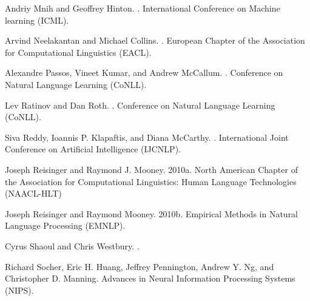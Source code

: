 \documentclass[11pt,a4paper]{article}
\begin{document}
\begin{thebibliography}{}
Andriy Mnih and Geoffrey Hinton.
.
\newblock International Conference on Machine learning (ICML).

Arvind Neelakantan and Michael Collins.
.
\newblock European Chapter of the Association for Computational Linguistics (EACL).

Alexandre Passos, Vineet Kumar, and Andrew McCallum.
.
\newblock Conference on Natural Language Learning (CoNLL).

Lev Ratinov and Dan Roth.
.
\newblock Conference on Natural Language Learning (CoNLL).

Siva Reddy, Ioannis P. Klapaftis, and Diana McCarthy.
.
\newblock International Joint Conference on Artificial Intelligence (IJCNLP).

Joseph Reisinger and Raymond J. Mooney.
\newblock 2010a.
\newblock North American Chapter of the Association for Computational Linguistics: Human Language Technologies (NAACL-HLT)

Joseph Reisinger and Raymond Mooney.
\newblock 2010b.
\newblock  Empirical Methods in Natural Language Processing (EMNLP).

Cyrus Shaoul and Chris Westbury.
.

Richard Socher, Eric H. Huang, Jeffrey Pennington, Andrew Y. Ng, and Christopher D. Manning.
\newblock Advances in Neural Information Processing Systems (NIPS).


\end{thebibliography}
\end{document}
